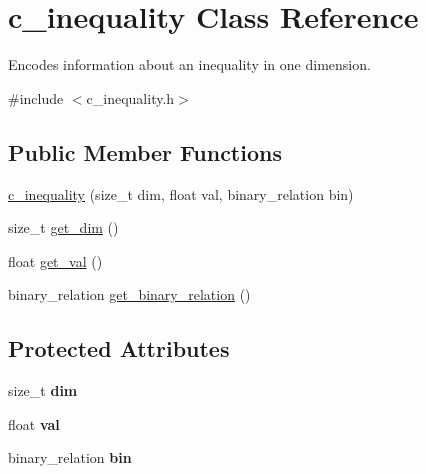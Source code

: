 \hypertarget{classc__inequality}{\section{c\-\_\-inequality \-Class \-Reference}
\label{classc__inequality}
}


\-Encodes information about an inequality in one dimension.  




{\ttfamily \#include $<$c\-\_\-inequality.\-h$>$}

\subsection*{\-Public \-Member \-Functions}
\begin{DoxyCompactItemize}
\item 
\hyperlink{classc__inequality_ada032a618e56bdaa99b1c24ae556d700}{c\-\_\-inequality} (size\-\_\-t dim, float val, binary\-\_\-relation bin)
\item 
size\-\_\-t \hyperlink{classc__inequality_ac476147d31b420279abe35a980e1fccd}{get\-\_\-dim} ()
\item 
float \hyperlink{classc__inequality_a78a1f4d784ea3dd8b83345f14f28ede2}{get\-\_\-val} ()
\item 
binary\-\_\-relation \hyperlink{classc__inequality_ab85ed92bf1208be7c9aa8822c63fc816}{get\-\_\-binary\-\_\-relation} ()
\end{DoxyCompactItemize}
\subsection*{\-Protected \-Attributes}
\begin{DoxyCompactItemize}
\item 
\hypertarget{classc__inequality_a2dd534bef185e5895f438fc27ff451ea}{size\-\_\-t {\bfseries dim}}\label{classc__inequality_a2dd534bef185e5895f438fc27ff451ea}

\item 
\hypertarget{classc__inequality_ae40270751c975cfbb7c0aa885cc5d4c5}{float {\bfseries val}}\label{classc__inequality_ae40270751c975cfbb7c0aa885cc5d4c5}

\item 
\hypertarget{classc__inequality_a452c9bb6b6ec1630bd3f9c03887555ad}{binary\-\_\-relation {\bfseries bin}}\label{classc__inequality_a452c9bb6b6ec1630bd3f9c03887555ad}

\end{DoxyCompactItemize}


